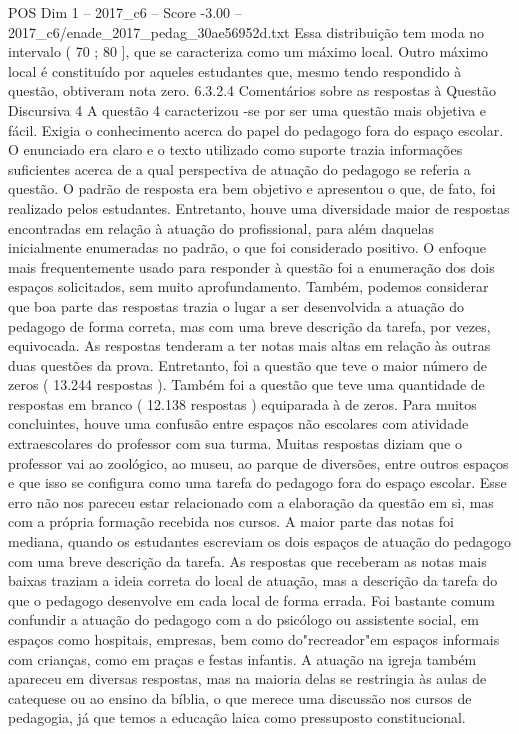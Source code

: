 \begin{textsample}{POS Dim 1 – 2017\_c6 – Score -3.00 – 2017\_c6/enade\_2017\_pedag\_30ae56952d.txt}
Essa distribuição tem moda no intervalo ( 70 ; 80 ], que se caracteriza como um máximo local.
Outro máximo local é constituído por aqueles estudantes que, mesmo tendo respondido à questão, obtiveram nota zero. 6.3.2.4 Comentários sobre as respostas à Questão Discursiva 4 A questão 4 caracterizou -se por ser uma questão mais objetiva e fácil.
Exigia o conhecimento acerca do papel do pedagogo fora do espaço escolar.
O enunciado era claro e o texto utilizado como suporte trazia informações suficientes acerca de a qual perspectiva de atuação do pedagogo se referia a questão.
O padrão de resposta era bem objetivo e apresentou o que, de fato, foi realizado pelos estudantes.
Entretanto, houve uma diversidade maior de respostas encontradas em relação à atuação do profissional, para além daquelas inicialmente enumeradas no padrão, o que foi considerado positivo.
O enfoque mais frequentemente usado para responder à questão foi a enumeração dos dois espaços solicitados, sem muito aprofundamento.
Também, podemos considerar que boa parte das respostas trazia o lugar a ser desenvolvida a atuação do pedagogo de forma correta, mas com uma breve descrição da tarefa, por vezes, equivocada.
As respostas tenderam a ter notas mais altas em relação às outras duas questões da prova.
Entretanto, foi a questão que teve o maior número de zeros ( 13.244 respostas ).
Também foi a questão que teve uma quantidade de respostas em branco ( 12.138 respostas ) equiparada à de zeros.
Para muitos concluintes, houve uma confusão entre espaços não escolares com atividade extraescolares do professor com sua turma.
Muitas respostas diziam que o professor vai ao zoológico, ao museu, ao parque de diversões, entre outros espaços e que isso se configura como uma tarefa do pedagogo fora do espaço escolar.
Esse erro não nos pareceu estar relacionado com a elaboração da questão em si, mas com a própria formação recebida nos cursos.
A maior parte das notas foi mediana, quando os estudantes escreviam os dois espaços de atuação do pedagogo com uma breve descrição da tarefa.
As respostas que receberam as notas mais baixas traziam a ideia correta do local de atuação, mas a descrição da tarefa do que o pedagogo desenvolve em cada local de forma errada.
Foi bastante comum confundir a atuação do pedagogo com a do psicólogo ou assistente social, em espaços como hospitais, empresas, bem como do"recreador"em espaços informais com crianças, como em praças e festas infantis.
A atuação na igreja também apareceu em diversas respostas, mas na maioria delas se restringia às aulas de catequese ou ao ensino da bíblia, o que merece uma discussão nos cursos de pedagogia, já que temos a educação laica como pressuposto constitucional.

\end{textsample}
